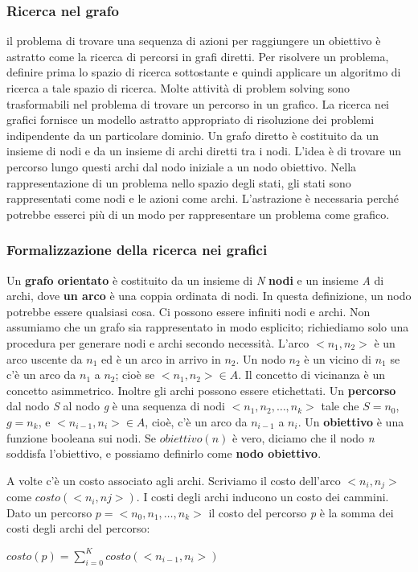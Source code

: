 \documentclass[a4paper]{extarticle}
\begin{document}
\subsubsection{Ricerca nel grafo}
il problema di trovare una sequenza di azioni per raggiungere un obiettivo è astratto come la ricerca di percorsi in grafi diretti. Per risolvere un problema, definire prima lo spazio di ricerca sottostante e quindi applicare un algoritmo di ricerca a tale spazio di ricerca. Molte attività di problem solving sono trasformabili nel problema di trovare un percorso in un grafico. La ricerca nei grafici fornisce un modello astratto appropriato di risoluzione dei problemi indipendente da un particolare dominio. Un grafo diretto è costituito da un insieme di nodi e da un insieme di archi diretti tra i nodi. L'idea è di trovare un percorso lungo questi archi dal nodo iniziale a un nodo obiettivo. Nella rappresentazione di un problema nello spazio degli stati, gli stati sono rappresentati come nodi e le azioni come archi. L'astrazione è necessaria perché potrebbe esserci più di un modo per rappresentare un problema come grafico.
\subsubsection{Formalizzazione della ricerca nei grafici}
Un \textbf{grafo orientato} è costituito da un insieme di \textit{N} \textbf{nodi} e un insieme \textit{A} di archi, dove \textbf{un arco} è una coppia ordinata di nodi. In questa definizione, un nodo potrebbe essere qualsiasi cosa. Ci possono essere infiniti nodi e archi. Non assumiamo che un grafo sia rappresentato in modo esplicito; richiediamo solo una procedura per generare nodi e archi secondo necessità. L'arco $<n_1 , n_2 >$ è un arco uscente da $n_1$ ed è un arco in arrivo in $n_2$. Un nodo $n_2$ è un vicino di $n_1$ se c'è un arco da $n_1$ a $n_2$; cioè se $< n_1 , n_2 > \in A$. Il concetto di vicinanza è un concetto asimmetrico. Inoltre gli archi possono essere etichettati. Un \textbf{percorso} dal nodo \textit{S} al nodo \textit{g} è una sequenza di nodi $< n_1 , n_2, \dots, n_k >$ tale che $S = n_0 $, $g = n_k$, e $<n_{i-1},n_i> \in A$, cioè, c'è un arco da $n_{i-1}$ a $n_i$. Un \textbf{obiettivo} è una funzione booleana sui nodi. Se $obiettivo(n)$ è vero, diciamo che il nodo \textit{n} soddisfa l'obiettivo, e possiamo definirlo come \textbf{nodo obiettivo}.

A volte c'è un costo associato agli archi. Scriviamo il costo dell'arco $< n_i,n_j>$ come $costo(<n_i,nj>)$. I costi degli archi inducono un costo dei cammini. Dato un percorso $p=<n_0,n_1,\dots,n_k>$ il costo del percorso \textit{p} è la somma dei costi degli archi del percorso:
\begin{center}
$costo(p)= \sum_{i=0}^K costo(<n_{i-1},n_i> )$
\end{center}
\end{document}
